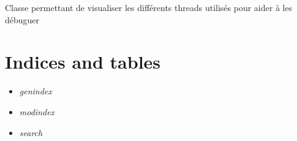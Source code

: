 \documentclass[letterpaper,10pt,french]{sphinxmanual}
\begin{document}
\begin{fulllineitems}
\label{visualisation:lib.visualisation.visu_threads.Visu_threads}
Classe permettant de visualiser les différents threads utilisés pour aider à les débuguer

\end{fulllineitems}



\chapter{Indices and tables}
\label{index:indices-and-tables}\begin{itemize}
\item {} 
\emph{genindex}

\item {} 
\emph{modindex}

\item {} 
\emph{search}

\end{itemize}
\end{document}
